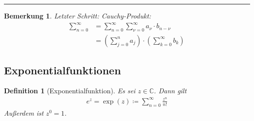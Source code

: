 \documentclass[11pt, twoside, a4paper]{article}
\theoremstyle{plain}
\newtheorem{bemerkung}[blockelement]{Bemerkung}
\newtheorem{definition}[blockelement]{Definition}
\newcommand{\pair}[1]{\left(#1\right)}
\newcommand{\definedas}[0]{\coloneqq}
\newcommand{\C}{\mathbb{C}}
\begin{document}
    \par\noindent\rule{\textwidth}{0.4pt}


    \begin{bemerkung}
        \marginnote{[16. Jan]}
        Letzter Schritt: Cauchy-Produkt:
        \begin{align*}
            \sum_{n=0}^{\infty} &= \sum_{n=0}^{\infty} \sum_{\nu=0}^{\infty} a_{\nu}\cdot b_{n-\nu}\\
            &= \pair{\sum_{j=0}^{n} a_j}\cdot\pair{\sum_{k=0}^{\infty} b_k}
        \end{align*}
    \end{bemerkung}

    \newpage

    \subsection{Exponentialfunktionen}\label{subsec:exp}

    \begin{definition}[Exponentialfunktion]
        Es sei $z\in\C$. Dann gilt
        \begin{align*}
            e^z = \exp(z)\definedas \sum_{n=0}^{\infty} \frac{z^n}{n!}
        \end{align*}
        Außerdem ist $z^0=1$.
    \end{definition}
\end{document}

